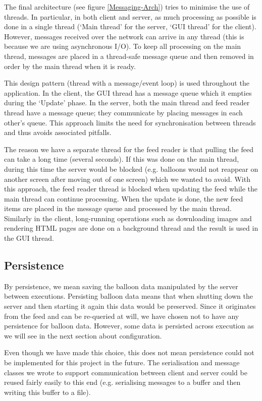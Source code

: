 The final architecture (see figure \vref{Messaging-Arch}) tries to minimise the
use of threads. In particular, in both client and server, as much processing as
possible is done in a single thread (`Main thread' for the server, `GUI thread'
for the client). However, messages received over the network
can arrive in any thread (this is because we are using asynchronous I/O). To 
keep all processing on the main thread, messages are placed in a thread-safe
message queue and then removed in order by the main thread when it is ready. 

This design pattern (thread with a message/event loop) is used throughout the
application. In the client, the GUI thread has a message queue which it empties
during the `Update' phase. In the server, both the main thread and feed reader 
thread have a message queue; they communicate by placing messages in each other's
queue. This approach limits the need for synchronisation between threads and 
thus avoids associated pitfalls.

The reason we have a separate thread for the feed reader is that pulling the 
feed can take a long time (several seconds). If this was done on the main 
thread, during this time the server would be blocked (e.g. balloons would not 
reappear on another screen after moving out of one screen) which we wanted to 
avoid. With this approach, the feed reader thread is blocked when updating the
feed while the main thread can continue processing. When the update is done, the
new feed items are placed in the message queue and processed by the main thread.
Similarly in the client, long-running operations such as downloading images and 
rendering HTML pages are done on a background thread and the result is used in 
the GUI thread.

\subsection{Persistence}

By persistence, we mean saving the balloon data manipulated by the server between 
executions. Persisting balloon data means that when shutting down the 
server and then starting it again this data would be preserved. Since it 
originates from the feed and can be re-queried at will, we have chosen not to
have any persistence for balloon data. However, some data is persisted across 
execution as we will see in the next section about configuration.

Even though we have made this choice, this does not mean persistence could not 
be implemented for this project in the future. The serialisation and message 
classes we wrote to support communication between client and server could be 
reused fairly easily to this end (e.g. serialising messages to a buffer and 
then writing this buffer to a file).

